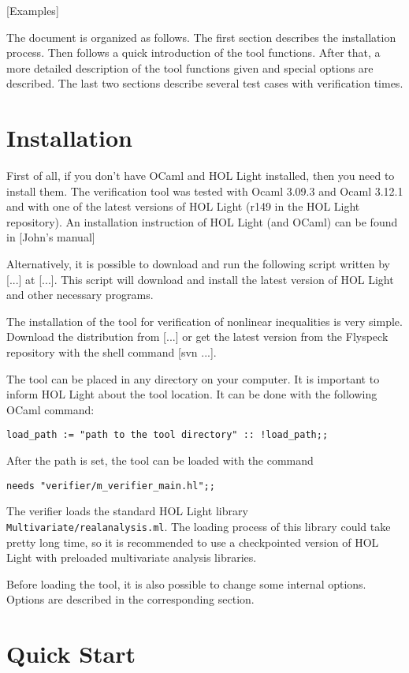\documentclass[a4paper]{article}
\begin{document}
[Examples]

The document is organized as follows. The first section describes the installation process. Then follows a quick introduction of the tool functions. After that, a more detailed description of the tool functions given and special options are described. The last two sections describe several test cases with verification times.


\section{Installation}
First of all, if you don't have OCaml and HOL Light installed, then you need to install them. The verification tool was tested with Ocaml 3.09.3 and Ocaml 3.12.1 and with one of the latest versions of HOL Light (r149 in the HOL Light repository).  An installation instruction of HOL Light (and OCaml) can be found in
[John's manual]

Alternatively, it is possible to download and run the following script written by [...] at [...]. This script will download and install the latest version of HOL Light and other necessary programs.

The installation of the tool for verification of nonlinear inequalities is very simple. Download the distribution from [...] or get the latest version from the Flyspeck repository with the shell command [svn ...].

The tool can be placed in any directory on your computer. It is important to inform HOL Light about the tool location. It can be done with the following OCaml command:

\verb|load_path := "path to the tool directory" :: !load_path;;|

After the path is set, the tool can be loaded with the command

\verb|needs "verifier/m_verifier_main.hl";;|

The verifier loads the standard HOL Light library \verb|Multivariate/realanalysis.ml|. The loading process of this library could take pretty long time, so it is recommended to use a checkpointed version of HOL Light with preloaded multivariate analysis libraries.

Before loading the tool, it is also possible to change some internal options. Options are described in the corresponding section.


\section{Quick Start}
\end{document}
